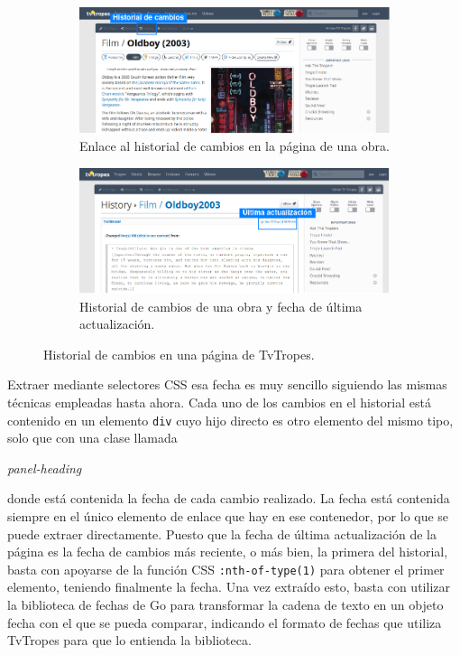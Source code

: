 \begin{figure}[!h]
    \centering
    \begin{subfigure}{\textwidth}
      \includegraphics[width=\linewidth]{img/historial_1.png}
      \caption{Enlace al historial de cambios en la página de una obra.}
    \end{subfigure}
    \begin{subfigure}{\textwidth}
      \includegraphics[width=\linewidth]{img/historial_2.png}
      \caption{Historial de cambios de una obra y fecha de última actualización.}
    \end{subfigure}
    \caption{Historial de cambios en una página de TvTropes.}
    \label{fig:changes_history}
\end{figure}

Extraer mediante selectores CSS esa fecha es muy sencillo siguiendo las mismas
técnicas empleadas hasta ahora. Cada uno de los cambios en el historial está
contenido en un elemento \texttt{div} cuyo hijo directo es otro elemento del
mismo tipo, solo que con una clase llamada
\begin{otherlanguage}{english}\textit{panel-heading}\end{otherlanguage} donde
está contenida la fecha de cada cambio realizado. La fecha está contenida
siempre en el único elemento de enlace que hay en ese contenedor, por lo
que se puede extraer directamente. Puesto que la fecha de última actualización
de la página es la fecha de cambios más reciente, o más bien, la primera del
historial, basta con apoyarse de la función CSS \texttt{:nth-of-type(1)} para
obtener el primer elemento, teniendo finalmente la fecha. Una vez extraído esto,
basta con utilizar la biblioteca de fechas de Go para transformar la cadena de
texto en un objeto fecha con el que se pueda comparar, indicando el formato de
fechas que utiliza TvTropes para que lo entienda la biblioteca.

